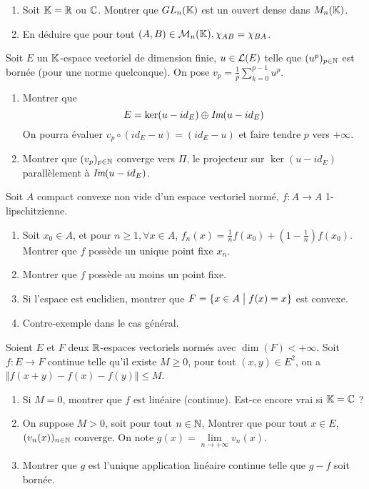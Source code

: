 \begin{exercise}
	\phantom{}
	\begin{enumerate}
		\item Soit $\mathbb{K}=\mathbb{R}$ ou $\mathbb{C}$. Montrer que $GL_{n}(\mathbb{K})$ est un ouvert dense dans $M_{n}(\mathbb{K})$.
		\item En déduire que pour tout $(A,B)\in\mathcal{M}_{n}(\mathbb{K}),\chi_{AB}=\chi_{BA}$.
	\end{enumerate}
\end{exercise}

\begin{exercise}
	Soit $E$ un $\mathbb{K}$-espace vectoriel de dimension finie, $u\in\mathcal{L}(E)$ telle que $(u^{p})_{p\in\mathbb{N}}$ est bornée (pour une norme quelconque). On pose $v_{p}=\frac{1}{p}\sum_{k=0}^{p-1}u^{p}$.
	\begin{enumerate}
		\item Montrer que 
		$$E=\ker(u-id_{E})\oplus\emph{Im}(u-id_{E})$$
		On pourra évaluer $v_{p}\circ(id_{E}-u)=(id_{E}-u)$ et faire tendre $p$ vers $+\infty$.
		\item Montrer que $(v_{p})_{p\in\mathbb{N}}$ converge vers $\Pi$, le projecteur sur $\ker(u-id_{E})$ parallèlement à $\emph{Im}(u-id_{E})$.
	\end{enumerate}
\end{exercise}

\begin{exercise}
	Soit $A$ compact convexe non vide d'un espace vectoriel normé, $f:A\to A$ 1-lipschitzienne.
	\begin{enumerate}
		\item Soit $x_{0}\in A$, et pour $n\geqslant1,\forall x\in A$, $f_{n}(x)=\frac{1}{n}f(x_{0})+(1-\frac{1}{n})f(x_{0})$. Montrer que $f$ possède un unique point fixe $x_{n}$.
		\item Montrer que $f$ possède au moins un point fixe.
		\item Si l'espace est euclidien, montrer que $F=\{x\in A\bigm| f(x)=x\}$ est convexe.
		\item Contre-exemple dans le cas général.
	\end{enumerate}
\end{exercise}

\begin{exercise}
	Soient $E$ et $F$ deux $\mathbb{R}$-espaces vectoriels normés avec $\dim(F)<+\infty$. Soit $f:E\to F$ continue telle qu'il existe $M\geqslant0$, pour tout $(x,y)\in E^{2}$, on a $\Vert f(x+y)-f(x)-f(y)\Vert\leqslant M$.
	\begin{enumerate}
		\item Si $M=0$, montrer que $f$ est linéaire (continue). Est-ce encore vrai si $\mathbb{K}=\mathbb{C}$ ?
		\item On suppose $M>0$, soit pour tout $n\in\mathbb{N}$, 
		Montrer que pour tout $x\in E$, $(v_{n}(x))_{n\in\mathbb{N}}$ converge. On note $g(x)=\lim\limits_{n\to+\infty}v_{n}(x)$.
		\item Montrer que $g$ est l'unique application linéaire continue telle que $g-f$ soit bornée.
	\end{enumerate}
\end{exercise}

